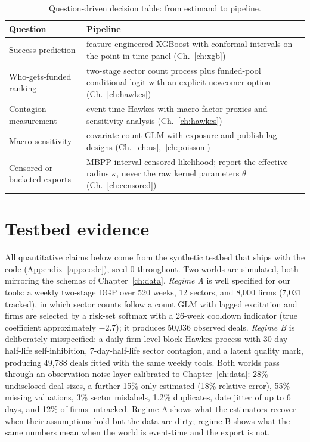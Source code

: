\begin{table}[htbp]
\centering
\small
\begin{tabular}{p{4.4cm}p{9.8cm}}
\toprule
Question & Pipeline \\
\midrule
Success prediction & feature-engineered XGBoost \cite{chen2016} with conformal intervals
\cite{romano2019} on the point-in-time panel (Ch.~\ref{ch:xgb}) \\
Who-gets-funded ranking & two-stage sector count process plus funded-pool conditional logit
\cite{mcfadden1974} with an explicit newcomer option (Ch.~\ref{ch:hawkes}) \\
Contagion measurement & event-time Hawkes \cite{hawkes1971,bacry2015} with macro-factor proxies and
sensitivity analysis (Ch.~\ref{ch:hawkes}) \\
Macro sensitivity & covariate count GLM with exposure and publish-lag designs
(Ch.~\ref{ch:us},~\ref{ch:poisson}) \\
Censored or bucketed exports & MBPP interval-censored likelihood; report the effective radius $\kappa$,
never the raw kernel parameters $\theta$ (Ch.~\ref{ch:censored}) \\
\bottomrule
\end{tabular}
\caption{Question-driven decision table: from estimand to pipeline.}
\label{tab:sel-pipeline}
\end{table}

\section{Testbed evidence}
\label{sec:sel-testbed}

All quantitative claims below come from the synthetic testbed that ships with the code
(Appendix~\ref{app:code}), seed 0 throughout. Two worlds are simulated, both mirroring the schemas of
Chapter~\ref{ch:data}. \emph{Regime A} is well specified for our tools: a weekly two-stage DGP over 520
weeks, 12 sectors, and 8{,}000 firms (7{,}031 tracked), in which sector counts follow a count GLM with lagged
excitation and firms are selected by a risk-set softmax with a 26-week cooldown indicator (true coefficient
approximately $-2.7$); it produces 50{,}036 observed deals. \emph{Regime B} is deliberately misspecified: a
daily firm-level block Hawkes process with 30-day-half-life self-inhibition, 7-day-half-life sector
contagion, and a latent quality mark, producing 49{,}788 deals fitted with the same weekly tools. Both worlds
pass through an observation-noise layer calibrated to Chapter~\ref{ch:data}: 28\% undisclosed deal sizes, a
further 15\% only estimated (18\% relative error), 55\% missing valuations, 3\% sector mislabels, 1.2\%
duplicates, date jitter of up to 6 days, and 12\% of firms untracked. Regime A shows what the estimators
recover when their assumptions hold but the data are dirty; regime B shows what the same numbers mean when
the world is event-time and the export is not.


